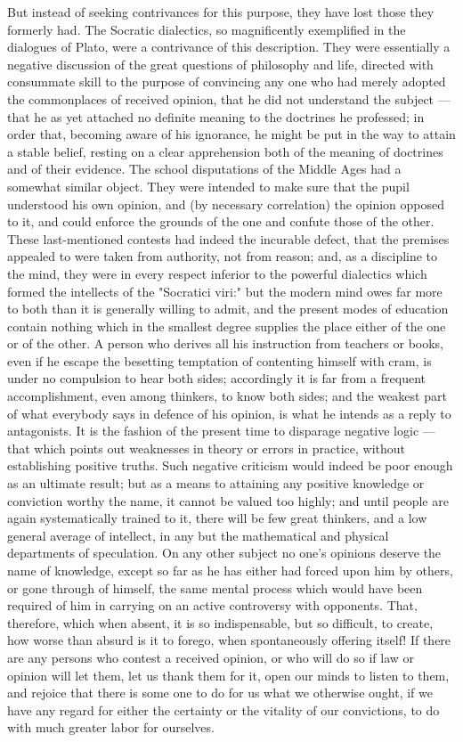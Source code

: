 \documentclass[12pt]{report}
\begin{document}
But instead of seeking contrivances for this purpose, they have lost those they formerly had. The Socratic dialectics, so magnificently exemplified in the dialogues of Plato, were a contrivance of this description. They were essentially a negative discussion of the great questions of philosophy and life, directed with consummate skill to the purpose of convincing any one who had merely adopted the commonplaces of received opinion, that he did not understand the subject — that he as yet attached no definite meaning to the doctrines he professed; in order that, becoming aware of his ignorance, he might be put in the way to attain a stable belief, resting on a clear apprehension both of the meaning of doctrines and of their evidence. The school disputations of the Middle Ages had a somewhat similar object. They were intended to make sure that the pupil understood his own opinion, and (by necessary correlation) the opinion opposed to it, and could enforce the grounds of the one and confute those of the other. These last-mentioned contests had indeed the incurable defect, that the premises appealed to were taken from authority, not from reason; and, as a discipline to the mind, they were in every respect inferior to the powerful dialectics which formed the intellects of the "Socratici viri:" but the modern mind owes far more to both than it is generally willing to admit, and the present modes of education contain nothing which in the smallest degree supplies the place either of the one or of the other. A person who derives all his instruction from teachers or books, even if he escape the besetting temptation of contenting himself with cram, is under no compulsion to hear both sides; accordingly it is far from a frequent accomplishment, even among thinkers, to know both sides; and the weakest part of what everybody says in defence of his opinion, is what he intends as a reply to antagonists. It is the fashion of the present time to disparage negative logic — that which points out weaknesses in theory or errors in practice, without establishing positive truths. Such negative criticism would indeed be poor enough as an ultimate result; but as a means to attaining any positive knowledge or conviction worthy the name, it cannot be valued too highly; and until people are again systematically trained to it, there will be few great thinkers, and a low general average of intellect, in any but the mathematical and physical departments of speculation. On any other subject no one's opinions deserve the name of knowledge, except so far as he has either had forced upon him by others, or gone through of himself, the same mental process which would have been required of him in carrying on an active controversy with opponents. That, therefore, which when absent, it is so indispensable, but so difficult, to create, how worse than absurd is it to forego, when spontaneously offering itself! If there are any persons who contest a received opinion, or who will do so if law or opinion will let them, let us thank them for it, open our minds to listen to them, and rejoice that there is some one to do for us what we otherwise ought, if we have any regard for either the certainty or the vitality of our convictions, to do with much greater labor for ourselves.
\end{document}
